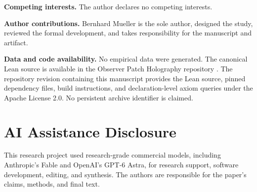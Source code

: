 \documentclass[11pt]{article}
\renewcommand{\_}{\textunderscore\allowbreak}
\theoremstyle{remark}
\begin{document}
\textbf{Competing interests.} The author declares no competing interests.

\textbf{Author contributions.} Bernhard Mueller is the sole author, designed
the study, reviewed the formal development, and takes responsibility for the
manuscript and artifact.

\textbf{Data and code availability.} No empirical data were generated. The
canonical Lean source is available in the Observer Patch Holography
repository \cite{observerPatchHolographyRepo}. The repository revision
containing this manuscript provides the Lean source, pinned dependency files,
build instructions, and declaration-level axiom queries under the Apache
License 2.0. No persistent archive identifier is claimed.


{\raggedright

\par}

\section*{AI Assistance Disclosure}
This research project used research-grade commercial models, including
Anthropic's Fable and OpenAI's GPT-6 Astra, for research support, software
development, editing, and synthesis. The authors are responsible for the
paper's claims, methods, and final text.
\end{document}
